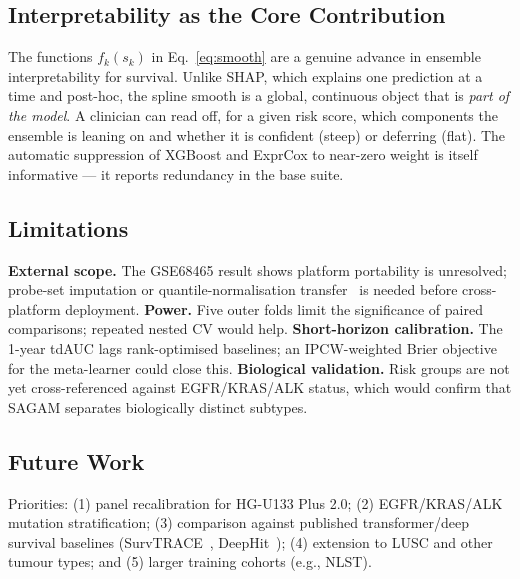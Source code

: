 \documentclass[journal]{IEEEtran}
\begin{document}
\subsection{Interpretability as the Core Contribution}
The functions $f_k(s_k)$ in Eq.~\eqref{eq:smooth} are a genuine advance in
ensemble interpretability for survival. Unlike SHAP, which explains one
prediction at a time and post-hoc, the spline smooth is a global, continuous
object that is \emph{part of the model}. A clinician can read off, for a given
risk score, which components the ensemble is leaning on and whether it is
confident (steep) or deferring (flat). The automatic suppression of XGBoost
and ExprCox to near-zero weight is itself informative --- it reports redundancy
in the base suite.

\subsection{Limitations}
\textbf{External scope.} The GSE68465 result shows platform portability is
unresolved; probe-set imputation or quantile-normalisation
transfer~\cite{luo2010comparison} is needed before cross-platform deployment.
\textbf{Power.} Five outer folds limit the significance of paired comparisons;
repeated nested CV would help. \textbf{Short-horizon calibration.} The 1-year
tdAUC lags rank-optimised baselines; an IPCW-weighted Brier objective for the
meta-learner could close this. \textbf{Biological validation.} Risk groups are
not yet cross-referenced against EGFR/KRAS/ALK status, which would confirm that
SAGAM separates biologically distinct subtypes.

\subsection{Future Work}
Priorities: (1) panel recalibration for HG-U133 Plus 2.0; (2) EGFR/KRAS/ALK
mutation stratification; (3) comparison against published transformer/deep
survival baselines (SurvTRACE~\cite{wang2022survtrace},
DeepHit~\cite{lee2018deephit}); (4) extension to LUSC and other tumour types;
and (5) larger training cohorts (e.g., NLST).

\end{document}
